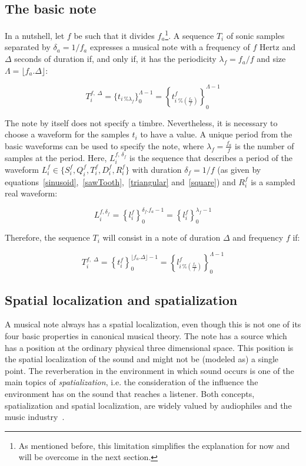 \subsection{The basic note}\label{notaBasica}
In a nutshell, let $f$ be such that it divides $f_a$\footnote{As mentioned before, this limitation simplifies the explanation for now and will be overcome in the next section.}. A sequence $T_i$ of sonic samples separated by $\delta_a=1/f_a$ expresses a musical note with a frequency of $f$ Hertz and $\Delta$ seconds of duration if, and only if, it has the periodicity $\lambda_f=f_a/f$ and size $\Lambda=\lfloor f_a . \Delta \rfloor$:

\begin{equation}\label{eq:notaBasica}
T_i^{f,\; \Delta}=\{t_{i \, \% \lambda_f} \}_0^{\Lambda-1}= \left \{t^f_{i \; \% \left( \frac{f_a}{f} \right) } \right \}_0^{\Lambda-1}
\end{equation}

The note by itself does not specify a timbre. Nevertheless, it is necessary to choose a waveform for the samples $t_i$ to have a value. A unique period from the basic waveforms can be used to specify the note, where $\lambda_f=\frac{f_a}{f}$ is the number of samples at the period. Here, $L_i^{f,\, \delta_f} $ is the sequence that describes a period of the waveform $L_i^f \in \{S_i^f,Q_i^f,T_i^f,D_i^f,R_i^f \}$ with duration $\delta_f=1/f$ (as given by equations~\ref{sinusoid},~\ref{sawTooth},~\ref{triangular} and~\ref{square}) and $R_i^f$ is a sampled real waveform:

\begin{equation}\label{periodoUnico}
L_i^{f , \delta_f } = \left\{ l_i^f \right\}_0^{\delta_f . f_a -1}=\left\{ l_i^f \right\}_0^{\lambda_f-1}
\end{equation}

Therefore, the sequence $T_i$ will consist in a note of duration $\Delta$ and frequency $f$ if:

\begin{equation}\label{eq:notaBasicaTimbre}
T_i^{f,\; \Delta}=\left\{t_i^f\right\}_0^{\lfloor f_a . \Delta \rfloor -1}=\left \{ l^f_{i\,\%\left(\frac{f_a}{f}\right)} \right \}_0^{\Lambda-1}
\end{equation}

\subsection{Spatial localization and spatialization}\label{subsec:spac}
A musical note always has a spatial localization, even though this is not one of its four basic properties in canonical musical theory. The note has a source which has a position at the ordinary physical three dimensional space. This position is the spatial localization of the sound and might not be (modeled as) a single point. The reverberation in the environment in which sound occurs is one of the main topics of \emph{spatialization}, i.e. the consideration of the influence the environment has on the sound that reaches a listener. Both concepts, spatialization and spatial localization, are widely valued by audiophiles and the music industry~\cite{floEsp}. 

